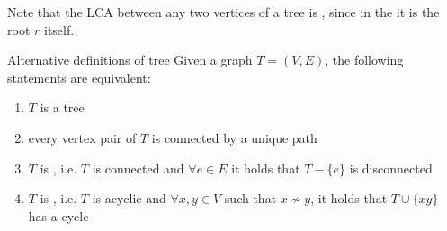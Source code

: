 \documentclass[a4paper, 12pt]{report}
\begin{document}
    Note that the LCA between any two vertices of a tree is , since in the  it is the root $r$ itself.

    \begin{framedthm}[label={tree alt}]{Alternative definitions of tree}
        Given a graph $T = (V, E)$, the following statements are equivalent:

        \begin{enumerate}
            \item $T$ is a tree
            \item every vertex pair of $T$ is connected by a unique path
            \item $T$ is , i.e. $T$ is connected and $\forall e \in E$ it holds that $T- \{e\}$ is disconnected
            \item $T$ is , i.e. $T$ is acyclic and $\forall x, y \in V$ such that $x \nsim y$, it holds that $T \cup \{xy\}$ has a cycle
        \end{enumerate}
    \end{framedthm}
\end{document}
